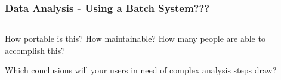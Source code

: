 \begin{frame}
	\frametitle{Data Analysis - Using a Batch System???}
	\vspace{-2em}
	\begin{columns}[onlywidth,T]
		\begin{column}{0.5\textwidth}
		\end{column}
	    \begin{column}{0.5\textwidth}
      
	    \end{column}	
	\end{columns}
	\vspace{-12.5em}
	\begin{columns}
		\begin{column}{0.5\textwidth}
			  \pause
			\begin{question}
				How portable is this? How maintainable? How many people are able to accomplish this?\\\pause\hline\vspace{0.5em}
				
				Which conclusions will your users in need of complex analysis steps draw?
			\end{question}	
		\end{column}
		\begin{column}{0.5\textwidth}
		\end{column}
	\end{columns}
\end{frame}	

